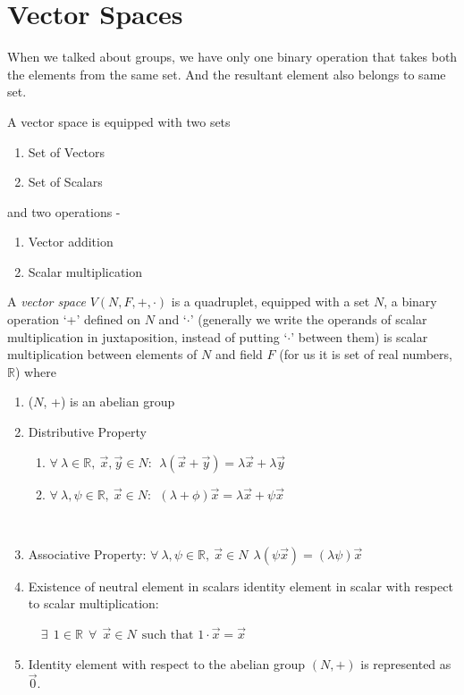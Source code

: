 \documentclass{article}
\begin{document}
\section{Vector Spaces}

When we talked about groups, we have only one binary operation that takes both the elements from the same set. And the resultant element also belongs to same set.\par
A vector space is equipped with two sets 
\begin{enumerate}
    \item Set of Vectors
    \item Set of Scalars
\end{enumerate}
and two operations -
\begin{enumerate}
    \item Vector addition 
    \item Scalar multiplication 
\end{enumerate}

A \textit{vector space} $V(N, F, + , \cdot)$ is a quadruplet, equipped with a set $N$, a binary operation `+' defined on $N$ and `$\cdot$' (generally we write the operands of scalar multiplication in juxtaposition, instead of putting `$\cdot$' between them) is scalar multiplication between elements of $N$ and field $F$ (for us it is set of real numbers, $\mathbb{R}$) where 
\begin{enumerate}
    \item ($N$, +) is an abelian group
    \item Distributive Property 
    \begin{enumerate}
        \item \begin{math}
            \forall ~ \lambda \in \mathbb{R}, ~ \vec{x}, \vec{y} \in N : ~~ \lambda(\vec{x} + \vec{y}) = \lambda\vec{x} + \lambda\vec{y}
        \end{math}
        \item \begin{math}
            \forall ~ \lambda, \psi \in \mathbb{R}, ~ \vec{x} \in N : ~~ (\lambda + \phi)\vec{x} = \lambda\vec{x} + \psi\vec{x}
        \end{math}
    \end{enumerate}\
    \item Associative Property: 
        \begin{math}\forall ~ \lambda, \psi \in \mathbb{R}, ~ \vec{x} \in N  ~~ \lambda(\psi\vec{x}) = (\lambda \psi)\vec{x}
        \end{math}
    \item Existence of neutral element in scalars
         identity element in scalar with respect to scalar multiplication: \par~~\begin{math}\exists~~ 1 \in \mathbb{R} ~~ \forall ~~ \vec{x} \in N ~~\text{such that }1\cdot\vec{x} = \vec{x}\end{math}
            
    \item Identity element with respect to the abelian group $(N , +)$ is represented as $\vec{0}$.
        
\end{enumerate}
\end{document}
